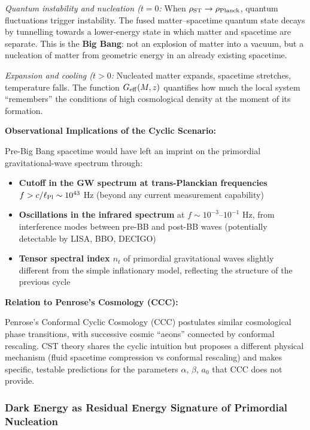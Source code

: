 \documentclass[10pt,a4paper]{article}
\providecommand{\tightlist}{\setlength{\itemsep}{0pt}\setlength{\parskip}{0pt}}
\begin{document}
\emph{Quantum instability and nucleation (\(t = 0\):} When
\(\rho_{\rm ST} \to \rho_{\rm Planck}\), quantum fluctuations trigger
instability. The fused matter--spacetime quantum state decays by
tunnelling towards a lower-energy state in which matter and spacetime
are separate. This is the \textbf{Big Bang}: not an explosion of matter
into a vacuum, but a nucleation of matter from geometric energy in an
already existing spacetime.

\emph{Expansion and cooling (\(t > 0\):} Nucleated matter expands,
spacetime stretches, temperature falls. The function
\(G_{\rm eff}(M,z)\) quantifies how much the local system ``remembers''
the conditions of high cosmological density at the moment of its
formation.

\textbf{Observational Implications of the Cyclic Scenario:}

Pre-Big Bang spacetime would have left an imprint on the primordial
gravitational-wave spectrum through:

\begin{itemize}
\tightlist
\item
  \textbf{Cutoff in the GW spectrum at trans-Planckian frequencies}
  \(f > c/\ell_{\rm Pl} \sim 10^{43}\) Hz (beyond any current
  measurement capability)
\item
  \textbf{Oscillations in the infrared spectrum} at
  \(f \sim 10^{-3}\)--\(10^{-1}\) Hz, from interference modes between
  pre-BB and post-BB waves (potentially detectable by LISA, BBO, DECIGO)
\item
  \textbf{Tensor spectral index \(n_t\)} of primordial gravitational
  waves slightly different from the simple inflationary model,
  reflecting the structure of the previous cycle
\end{itemize}

\textbf{Relation to Penrose's Cosmology (CCC):}

Penrose's \cite{Penrose2010} Conformal Cyclic Cosmology (CCC) postulates similar
cosmological phase transitions, with successive cosmic ``aeons''
connected by conformal rescaling. CST theory shares the cyclic intuition
but proposes a different physical mechanism (fluid spacetime compression
vs conformal rescaling) and makes specific, testable predictions for the
parameters \(\alpha\), \(\beta\), \(a_0\) that CCC does not provide.

\subsubsection{Dark Energy as Residual Energy Signature of Primordial Nucleation}
\end{document}
